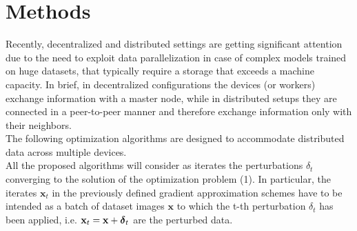 \section{Methods}
Recently, decentralized and distributed settings are getting significant attention due to the need to exploit data
parallelization in case of complex models trained on huge datasets, that typically require a storage that exceeds
a machine capacity. In brief, in decentralized configurations the devices (or workers) exchange information with a master node, while in distributed setups they are connected in a peer-to-peer manner and therefore exchange information only with their neighbors. \\
\indent The following optimization algorithms are designed to accommodate distributed data across multiple devices.\\
\indent All the proposed algorithms will consider as iterates the perturbations \mbox{\boldmath$ \delta$}$_t$ converging to the solution of the optimization problem (1). In particular, the iterates $\mathbf{x}_t$ in the previously defined gradient approximation schemes have to be intended as a batch of dataset images $\mathbf{x}$ to which the t-th perturbation \mbox{\boldmath$ \delta$}$_t$ has been applied, i.e. $\mathbf{x}_t = \mathbf{x} + \mbox{\boldmath$ \delta$}_t$ are the perturbed data.